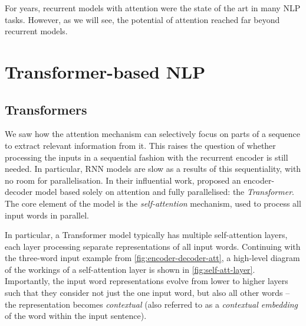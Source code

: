 \documentclass[bsc,frontabs,twoside,singlespacing,parskip,deptreport]{infthesis}
\begin{document}
{{    For years, recurrent models with attention were the state of the art in many NLP tasks. However, as we will see, the potential of attention reached far beyond recurrent models.
  }

  \section{Transformer-based NLP}{
    \label{sec:Transformer-based-NLP}
    \subsection{Transformers}{
      \label{sec:Transformers}
      We saw how the attention mechanism can selectively focus on parts of a sequence to extract relevant information from it. This raises the question of whether processing the inputs in a sequential fashion with the recurrent encoder is still needed. In particular, RNN models are slow as a results of this sequentiality, with no room for parallelisation. In their influential work, \citet{Vaswani_2017} proposed an encoder-decoder model based solely on attention and fully parallelised: the \textit{Transformer}. The core element of the model is the \textit{self-attention} mechanism, used to process all input words in parallel.

      In particular, a Transformer model typically has multiple self-attention layers, each layer processing separate representations of all input words. Continuing with the three-word input example from \autoref{fig:encoder-decoder-att}, a high-level diagram of the workings of a self-attention layer is shown in \autoref{fig:self-att-layer}. Importantly, the input word representations evolve from lower to higher layers such that they consider not just the one input word, but also all other words -- the representation becomes \textit{contextual} (also referred to as a \textit{contextual embedding} of the word within the input sentence).

}}}
\end{document}

